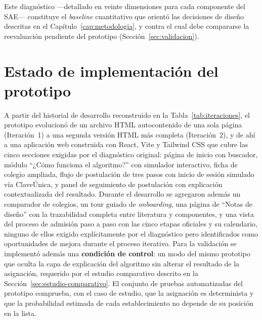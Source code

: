 Este diagnóstico —detallado en veinte dimensiones para cada componente del SAE— constituye el \emph{baseline} cuantitativo que orientó las decisiones de diseño descritas en el Capítulo~\ref{cap:metodologia}, y contra el cual debe compararse la reevaluación pendiente del prototipo (Sección~\ref{sec:validacion}).

\section{Estado de implementación del prototipo}\label{sec:res-prototipo}

A partir del historial de desarrollo reconstruido en la Tabla~\ref{tab:iteraciones}, el prototipo evolucionó de un archivo HTML autocontenido de una sola página (Iteración~1) a una segunda versión HTML más completa (Iteración~2), y de ahí a una aplicación web construida con React, Vite y Tailwind CSS que cubre las cinco secciones exigidas por el diagnóstico original: página de inicio con buscador, módulo ``¿Cómo funciona el algoritmo?'' con simulador interactivo, ficha de colegio ampliada, flujo de postulación de tres pasos con inicio de sesión simulado vía ClaveÚnica, y panel de seguimiento de postulación con explicación contextualizada del resultado. Durante el desarrollo se agregaron además un comparador de colegios, un tour guiado de \emph{onboarding}, una página de ``Notas de diseño'' con la trazabilidad completa entre literatura y componentes, y una vista del proceso de admisión paso a paso con las cinco etapas oficiales y su calendario, ninguno de ellos exigido explícitamente por el diagnóstico pero identificados como oportunidades de mejora durante el proceso iterativo. Para la validación se implementó además una \textbf{condición de control}: un modo del mismo prototipo que oculta la capa de explicación del algoritmo sin alterar el resultado de la asignación, requerido por el estudio comparativo descrito en la Sección~\ref{sec:estudio-comparativo}. El conjunto de pruebas automatizadas del prototipo comprueba, con el caso de estudio, que la asignación es determinista y que la probabilidad estimada de cada establecimiento no depende de su posición en la lista.

